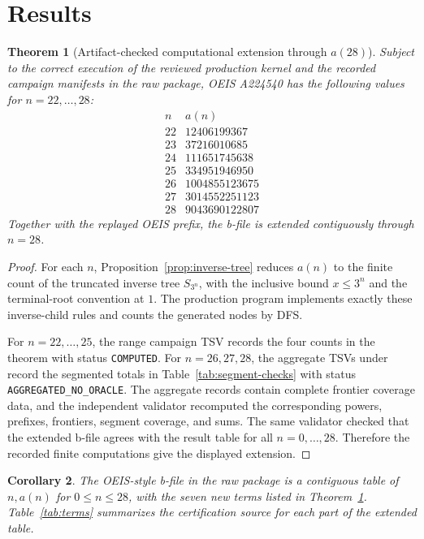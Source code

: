 \documentclass[11pt]{article}
\newtheorem{theorem}{Theorem}
\newtheorem{corollary}[theorem]{Corollary}
\theoremstyle{definition}
\theoremstyle{remark}
\begin{document}
\section{Results}

\begin{theorem}[Artifact-checked computational extension through \(a(28)\)]
\label{thm:main}
Subject to the correct execution of the reviewed production kernel and the
recorded campaign manifests in the raw package, OEIS A224540 has the following
values for \(n=22,\ldots,28\):
\[
\begin{array}{c|r}
n & a(n)\\
\hline
22 & 12406199367\\
23 & 37216010685\\
24 & 111651745638\\
25 & 334951946950\\
26 & 1004855123675\\
27 & 3014552251123\\
28 & 9043690122807
\end{array}
\]
Together with the replayed OEIS prefix, the b-file is extended contiguously
through \(n=28\).
\end{theorem}

\begin{proof}
For each \(n\), Proposition~\ref{prop:inverse-tree} reduces \(a(n)\) to the
finite count of the truncated inverse tree \(S_{3^n}\), with the inclusive
bound \(x\leq 3^n\) and the terminal-root convention at \(1\).  The production
program implements exactly these inverse-child rules and counts the generated
nodes by DFS.

For \(n=22,\ldots,25\), the range campaign TSV
 records the four counts in the
theorem with status \texttt{COMPUTED}.  For \(n=26,27,28\), the aggregate TSVs
under  record the segmented totals in
Table~\ref{tab:segment-checks} with status \texttt{AGGREGATED\_NO\_ORACLE}.
The aggregate records contain complete frontier coverage data, and the
independent validator recomputed the corresponding powers, prefixes,
frontiers, segment coverage, and sums.  The same validator checked that the
extended b-file agrees with the result table for all \(n=0,\ldots,28\).
Therefore the recorded finite computations give the displayed extension.
\end{proof}

\begin{corollary}
The OEIS-style b-file  in the raw package is a
contiguous table of \(n,a(n)\) for \(0\leq n\leq 28\), with the seven new terms
listed in Theorem~\ref{thm:main}.  Table~\ref{tab:terms} summarizes the
certification source for each part of the extended table.
\end{corollary}
\end{document}
